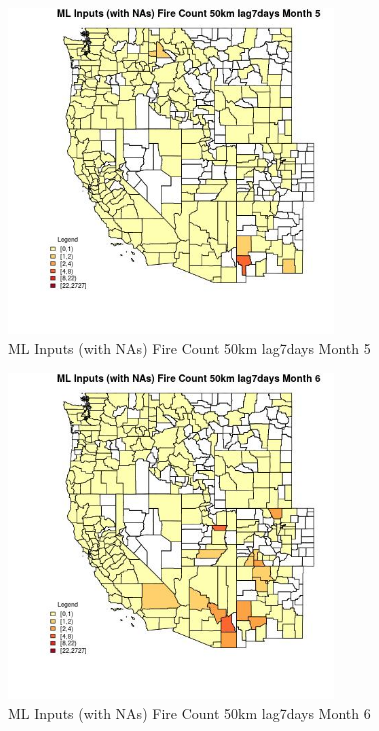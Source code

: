\begin{figure} 
\centering  
\includegraphics[width=0.77\textwidth]{Code_Outputs/Report_ML_input_PM25_Step4_part_f_de_duplicated_aveswNAs_CountyFire_Count_50km_lag7daysmedianMonth5.jpg} 
\caption{\label{fig:Report_ML_input_PM25_Step4_part_f_de_duplicated_aveswNAsCountyFire_Count_50km_lag7daysmedianMonth5}ML Inputs (with NAs) Fire Count 50km lag7days Month 5} 
\end{figure} 
 

\begin{figure} 
\centering  
\includegraphics[width=0.77\textwidth]{Code_Outputs/Report_ML_input_PM25_Step4_part_f_de_duplicated_aveswNAs_CountyFire_Count_50km_lag7daysmedianMonth6.jpg} 
\caption{\label{fig:Report_ML_input_PM25_Step4_part_f_de_duplicated_aveswNAsCountyFire_Count_50km_lag7daysmedianMonth6}ML Inputs (with NAs) Fire Count 50km lag7days Month 6} 
\end{figure} 
 


